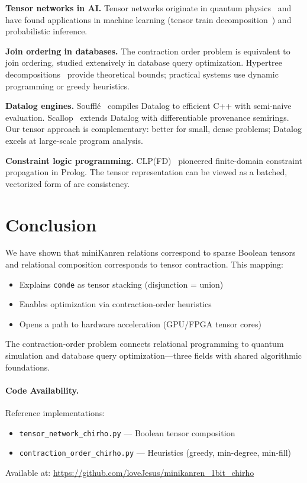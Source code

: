 \documentclass[11pt,a4paper]{article}
\begin{document}
\textbf{Tensor networks in AI.}
Tensor networks originate in quantum physics~\cite{tensor_networks_intro_chirho} and
have found applications in machine learning (tensor train decomposition~\cite{tensor_train_chirho})
and probabilistic inference.

\textbf{Join ordering in databases.}
The contraction order problem is equivalent to join ordering, studied extensively
in database query optimization. Hypertree decompositions~\cite{gottlob_hypertree_chirho}
provide theoretical bounds; practical systems use dynamic programming or greedy heuristics.

\textbf{Datalog engines.}
Souffl\'e~\cite{souffle_chirho} compiles Datalog to efficient C++ with semi-naive evaluation.
Scallop~\cite{scallop_chirho} extends Datalog with differentiable provenance semirings.
Our tensor approach is complementary: better for small, dense problems; Datalog
excels at large-scale program analysis.

\textbf{Constraint logic programming.}
CLP(FD)~\cite{clpfd_chirho} pioneered finite-domain constraint propagation in Prolog.
The tensor representation can be viewed as a batched, vectorized form of arc consistency.

\section{Conclusion}
\label{sec:conclusion_chirho}

We have shown that miniKanren relations correspond to sparse Boolean tensors and
relational composition corresponds to tensor contraction. This mapping:
\begin{itemize}
  \item Explains \texttt{conde} as tensor stacking (disjunction = union)
  \item Enables optimization via contraction-order heuristics
  \item Opens a path to hardware acceleration (GPU/FPGA tensor cores)
\end{itemize}

The contraction-order problem connects relational programming to quantum simulation
and database query optimization---three fields with shared algorithmic foundations.

\paragraph{Code Availability.}
Reference implementations:
\begin{itemize}
  \item \texttt{tensor\_network\_chirho.py} --- Boolean tensor composition
  \item \texttt{contraction\_order\_chirho.py} --- Heuristics (greedy, min-degree, min-fill)
\end{itemize}
Available at: \url{https://github.com/loveJesus/minikanren_1bit_chirho}
\end{document}
